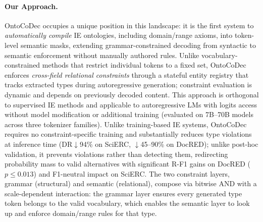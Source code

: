 \paragraph{Our Approach.}
OntoCoDec occupies a unique position in this landscape: it is the first system to \emph{automatically compile} IE ontologies, including domain/range axioms, into token-level semantic masks, extending grammar-constrained decoding from syntactic to semantic enforcement without manually authored rules.
Unlike vocabulary-constrained methods that restrict individual tokens to a fixed set, OntoCoDec enforces \emph{cross-field relational constraints} through a stateful entity registry that tracks extracted types during autoregressive generation; constraint evaluation is dynamic and depends on previously decoded content.
This approach is orthogonal to supervised IE methods and applicable to autoregressive LMs with logits access without model modification or additional training (evaluated on 7B--70B models across three tokenizer families).
Unlike training-based IE systems, OntoCoDec requires no constraint-specific training and substantially reduces type violations at inference time (DR$\downarrow$94\% on SciERC, $\downarrow$45--90\% on DocRED); unlike post-hoc validation, it prevents violations rather than detecting them, redirecting probability mass to valid alternatives with significant R-F1 gains on DocRED ($p \leq 0.013$) and F1-neutral impact on SciERC.
The two constraint layers, grammar (structural) and semantic (relational), compose via bitwise AND with a scale-dependent interaction: the grammar layer ensures every generated type token belongs to the valid vocabulary, which enables the semantic layer to look up and enforce domain/range rules for that type.
